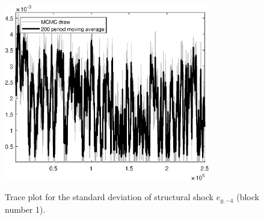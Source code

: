 \begin{figure}[H]
\centering
  \includegraphics[width=0.8\textwidth]{BRS_aggregate/graphs/TracePlot_SE_e_g_news_blck_1}\\
    \caption{Trace plot for the standard deviation of structural shock ${e_{g,-4}}$ (block number 1).}
\end{figure}
